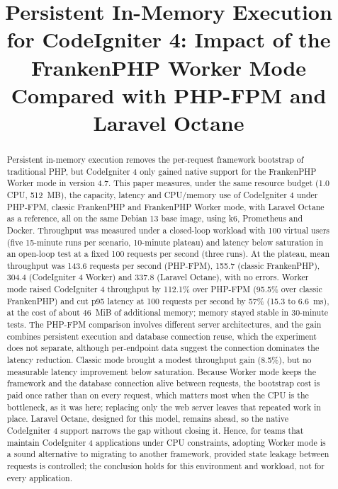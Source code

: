 \documentclass[sigconf, nonacm, screen, anonymous, language=portuguese, language=spanish, language={main=english}]{acmart}
\begin{document}
\title{Persistent In-Memory Execution for CodeIgniter 4: Impact of the FrankenPHP Worker Mode Compared with PHP-FPM and Laravel Octane}


\begin{abstract}
Persistent in-memory execution removes the per-request framework bootstrap of traditional PHP, but CodeIgniter 4 only gained native support for the FrankenPHP Worker mode in version 4.7. This paper measures, under the same resource budget (1.0 CPU, 512~MB), the capacity, latency and CPU/memory use of CodeIgniter 4 under PHP-FPM, classic FrankenPHP and FrankenPHP Worker mode, with Laravel Octane as a reference, all on the same Debian 13 base image, using k6, Prometheus and Docker. Throughput was measured under a closed-loop workload with 100 virtual users (five 15-minute runs per scenario, 10-minute plateau) and latency below saturation in an open-loop test at a fixed 100 requests per second (three runs). At the plateau, mean throughput was 143.6 requests per second (PHP-FPM), 155.7 (classic FrankenPHP), 304.4 (CodeIgniter 4 Worker) and 337.8 (Laravel Octane), with no errors. Worker mode raised CodeIgniter 4 throughput by 112.1\% over PHP-FPM (95.5\% over classic FrankenPHP) and cut p95 latency at 100 requests per second by 57\% (15.3 to 6.6~ms), at the cost of about 46~MiB of additional memory; memory stayed stable in 30-minute tests. The PHP-FPM comparison involves different server architectures, and the gain combines persistent execution and database connection reuse, which the experiment does not separate, although per-endpoint data suggest the connection dominates the latency reduction. Classic mode brought a modest throughput gain (8.5\%), but no measurable latency improvement below saturation. Because Worker mode keeps the framework and the database connection alive between requests, the bootstrap cost is paid once rather than on every request, which matters most when the CPU is the bottleneck, as it was here; replacing only the web server leaves that repeated work in place. Laravel Octane, designed for this model, remains ahead, so the native CodeIgniter 4 support narrows the gap without closing it. Hence, for teams that maintain CodeIgniter 4 applications under CPU constraints, adopting Worker mode is a sound alternative to migrating to another framework, provided state leakage between requests is controlled; the conclusion holds for this environment and workload, not for every application.
\end{abstract}
\end{document}
